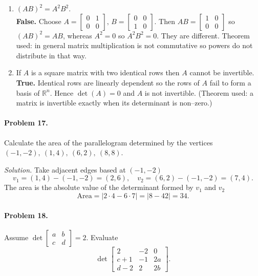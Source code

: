 \documentclass{article}
\begin{document}
\begin{multicols*}{2}
\begin{enumerate}[label=(\alph*)]
\item $(AB)^{2}=A^{2}B^{2}$.\\
\textbf{False.}  
Choose  
$
A=\begin{bmatrix}0&1\\0&0\end{bmatrix},\,
B=\begin{bmatrix}0&0\\1&0\end{bmatrix}.
$  
Then $AB=\begin{bmatrix}1&0\\0&0\end{bmatrix}$ so $(AB)^{2}=AB$, whereas  
$A^{2}=0$ so $A^{2}B^{2}=0$.  
They are different.  
Theorem used: in general matrix multiplication is not commutative so powers do not distribute in that way.

\item If $A$ is a square matrix with two identical rows then $A$ cannot be invertible.\\
\textbf{True.}  
Identical rows are linearly dependent so the rows of $A$ fail to form a basis of $\mathbb R^{n}$.  
Hence $\det(A)=0$ and $A$ is not invertible.  
(Theorem used: a matrix is invertible exactly when its determinant is non–zero.)

\end{enumerate}

\paragraph{Problem 17.}
Calculate the area of the parallelogram determined by the vertices  
$(-1,-2),\ (1,4),\ (6,2),\ (8,8)$.

\textit{Solution.}  
Take adjacent edges based at $(-1,-2)$  
\[
v_{1}=(1,4)-(-1,-2)=(2,6),\quad
v_{2}=(6,2)-(-1,-2)=(7,4).
\]
The area is the absolute value of the determinant formed by $v_{1}$ and $v_{2}$  
\[
\text{Area}=\lvert 2\cdot 4-6\cdot 7\rvert=\lvert 8-42\rvert=34.
\]

\paragraph{Problem 18.}
Assume  
$\det\!\begin{bmatrix}a&b\\c&d\end{bmatrix}=2$.  
Evaluate
\[
\det\!\begin{bmatrix}
2 & -2 & 0\\
c+1 & -1 & 2a\\
d-2 & 2 & 2b
\end{bmatrix}.
\]


\end{multicols*}
\end{document}

